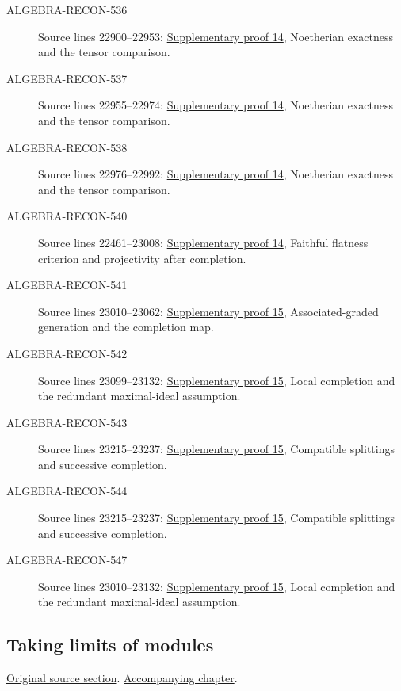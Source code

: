 \begin{description}
\item[ALGEBRA-RECON-536] Source lines 22900--22953: \hyperlink{algebra_projectivity_completion_notes_20260927}{Supplementary proof 14}, Noetherian exactness and the tensor comparison.
\item[ALGEBRA-RECON-537] Source lines 22955--22974: \hyperlink{algebra_projectivity_completion_notes_20260927}{Supplementary proof 14}, Noetherian exactness and the tensor comparison.
\item[ALGEBRA-RECON-538] Source lines 22976--22992: \hyperlink{algebra_projectivity_completion_notes_20260927}{Supplementary proof 14}, Noetherian exactness and the tensor comparison.
\item[ALGEBRA-RECON-540] Source lines 22461--23008: \hyperlink{algebra_projectivity_completion_notes_20260927}{Supplementary proof 14}, Faithful flatness criterion and projectivity after completion.
\item[ALGEBRA-RECON-541] Source lines 23010--23062: \hyperlink{algebra_graded_completion_notes_20260927}{Supplementary proof 15}, Associated-graded generation and the completion map.
\item[ALGEBRA-RECON-542] Source lines 23099--23132: \hyperlink{algebra_graded_completion_notes_20260927}{Supplementary proof 15}, Local completion and the redundant maximal-ideal assumption.
\item[ALGEBRA-RECON-543] Source lines 23215--23237: \hyperlink{algebra_graded_completion_notes_20260927}{Supplementary proof 15}, Compatible splittings and successive completion.
\item[ALGEBRA-RECON-544] Source lines 23215--23237: \hyperlink{algebra_graded_completion_notes_20260927}{Supplementary proof 15}, Compatible splittings and successive completion.
\item[ALGEBRA-RECON-547] Source lines 23010--23132: \hyperlink{algebra_graded_completion_notes_20260927}{Supplementary proof 15}, Local completion and the redundant maximal-ideal assumption.
\end{description}

\subsection{Taking limits of modules}
\hypertarget{algebra-source-section-limits}{}
\noindent\href{https://github.com/stacks/stacks-project/blob/a04446e57ec1fbc252a871afcec7752fb2807b14/algebra.tex\#L23247}{Original source section}. \href{algebra.pdf\#nameddest=section-limits}{Accompanying chapter}.

